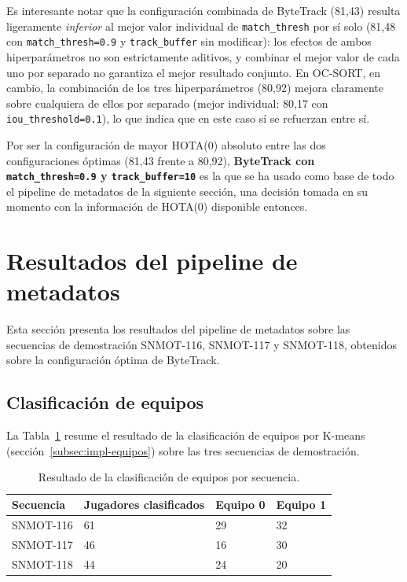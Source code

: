 Es interesante notar que la configuración combinada de ByteTrack
(81{,}43) resulta ligeramente \emph{inferior} al mejor valor individual de
\texttt{match\_thresh} por sí solo (81{,}48 con
\texttt{match\_thresh=0.9} y \texttt{track\_buffer} sin modificar): los
efectos de ambos hiperparámetros no son estrictamente aditivos, y combinar
el mejor valor de cada uno por separado no garantiza el mejor resultado
conjunto. En OC-SORT, en cambio, la combinación de los tres
hiperparámetros (80{,}92) mejora claramente sobre cualquiera de ellos por
separado (mejor individual: 80{,}17 con \texttt{iou\_threshold=0.1}), lo
que indica que en este caso sí se refuerzan entre sí.

Por ser la configuración de mayor HOTA(0) absoluto entre las dos
configuraciones óptimas (81,43 frente a 80,92), \textbf{ByteTrack con
\texttt{match\_thresh=0.9} y \texttt{track\_buffer=10}} es la que se ha
usado como base de todo el pipeline de metadatos de la siguiente sección,
una decisión tomada en su momento con la información de HOTA(0) disponible
entonces.

\section{Resultados del pipeline de metadatos}
\label{sec:pruebas-metadatos}

Esta sección presenta los resultados del pipeline de metadatos sobre las secuencias de
demostración SNMOT-116, SNMOT-117 y SNMOT-118, obtenidos sobre la
configuración óptima de ByteTrack.

\subsection{Clasificación de equipos}

La Tabla~\ref{tab:pruebas-equipos} resume el resultado de la clasificación
de equipos por K-means (sección~\ref{subsec:impl-equipos}) sobre las tres
secuencias de demostración.

\begin{table}[htp]
\centering
\caption{Resultado de la clasificación de equipos por secuencia.}
\label{tab:pruebas-equipos}
\renewcommand{\arraystretch}{1.25}
\begin{tabular}{|p{2.2cm}|p{2.2cm}|p{2.2cm}|p{2.2cm}|}
\hline
\rowcolor{gray!25}
\textbf{Secuencia} & \textbf{Jugadores clasificados} & \textbf{Equipo 0} & \textbf{Equipo 1} \\
\hline
SNMOT-116 & 61 & 29 & 32 \\
\hline
SNMOT-117 & 46 & 16 & 30 \\
\hline
SNMOT-118 & 44 & 24 & 20 \\
\hline
\end{tabular}
\end{table}

